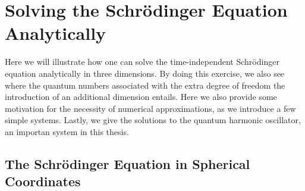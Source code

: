 \chapter{Solving the Schrödinger Equation Analytically}
\label{app:analytical_tise}

Here we will illustrate how one can solve the time-independent Schrödinger
equation analytically in three dimensions. By doing this exercise, we also see
where the quantum numbers associated with the extra degree of freedom the
introduction of an additional dimension entails. Here we also provide some 
motivation for the necessity of numerical approximations, as we introduce a 
few simple systems. Lastly, we give the solutions to the quantum harmonic 
oscillator, an importan system in this thesis.

\section{The Schrödinger Equation in Spherical Coordinates}


